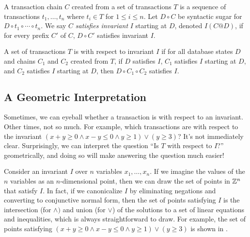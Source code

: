 A transaction chain $C$ created from a set of transactions $T$ is a sequence of
transactions $t_1, \ldots, t_n$ where $t_i \in T$ for $1 \leq i \leq n$. Let $D
\circ C$ be syntactic sugar for $D \circ t_1 \circ \cdots \circ t_n$. We say
$C$ \emph{satisfies invariant} $I$ starting at $D$, denoted $I(C @ D)$, if for
every prefix $C'$ of $C$, $D \circ C'$ satisfies invariant $I$.

A set of transactions $T$ is \iconfluent{} with respect to invariant $I$ if for
all database states $D$ and chains $C_1$ and $C_2$ created from $T$, if $D$
satisfies $I$, $C_1$ satisfies $I$ starting at $D$, and $C_2$ satisfies $I$
starting at $D$, then $D \circ C_1 \circ C_2$ satisfies $I$.

\subsection{A Geometric Interpretation}\label{sec:counter-geometry}
\newcommand{\inva}{x + y \geq 0}
\newcommand{\invb}{x - y \leq 0}
\newcommand{\invc}{y \geq 1}
\newcommand{\invd}{y \geq 3}
\newcommand{\inv}{(\inva \land \invb \land \invc) \lor (\invd)}

Sometimes, we can eyeball whether a transaction is \iconfluent{} with respect
to an invariant. Other times, not so much. For example, which transactions are
\iconfluent{} with respect to the invariant $\inv$? It's not immediately
clear.  Surprisingly, we can interpret the question ``Is $T$ \iconfluent{} with
respect to $I$?'' geometrically, and doing so will make answering the question
much easier!

Consider an invariant $I$ over $n$ variables $x_1, \ldots, x_n$. If we imagine
the values of the $n$ variables as an $n$-dimensional point, then we can draw
the set of points in $\mathbb{Z}^n$ that satisfy $I$. In fact, if we canonicalize
$I$ by eliminating negations and converting to conjunctive normal form, then
the set of points satisfying $I$ is the intersection (for $\land)$ and union
(for $\lor$) of the solutions to a set of linear equations and inequalities,
which is always straightforward to draw. For example, the set of points
satisfying $\inv$ is shown in .

